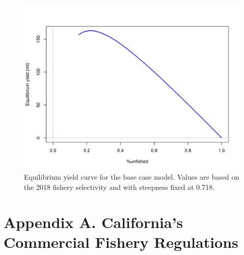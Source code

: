 \documentclass[12pt,]{article}
\begin{document}
\begin{figure}
\centering
\includegraphics{r4ss/plots_mod1/yield1_yield_curve.png}
\caption{Equilibrium yield curve for the base case model. Values are
based on the 2018 fishery selectivity and with steepness fixed at 0.718.
\label{fig:yield1_yield_curve}}
\end{figure}

\FloatBarrier

\FloatBarrier
\newpage

\hypertarget{appendix-a.-californias-commercial-fishery-regulations}{\section*{Appendix
A. California's Commercial Fishery
Regulations}\label{appendix-a.-californias-commercial-fishery-regulations}}

\renewcommand{\thepage}{A-\arabic{page}}
\renewcommand{\thefigure}{A\arabic{figure}}

\setcounter{page}{1} \setcounter{figure}{1}
\end{document}

